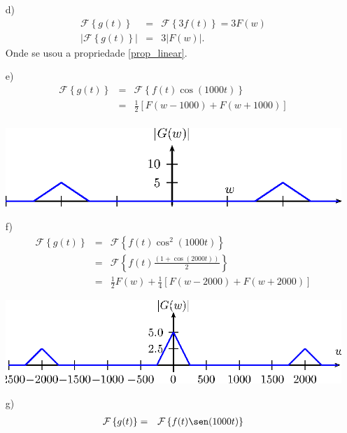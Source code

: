 \begin{resp}
\begin{itemize}
    \item[d)] 
     \begin{eqnarray*}
    \mathcal{F}\left\{g(t)\right\}&=&\mathcal{F}\left\{3f(t)\right\}=3F\left(w\right)\\
    \left|\mathcal{F}\left\{g(t)\right\}\right|&=&3\left|F\left(w\right)\right|.
    \end{eqnarray*}
    Onde se usou a propriedade \ref{prop_linear}.
    \item[e)] 
     \begin{eqnarray*}
    \mathcal{F}\left\{g(t)\right\}&=&\mathcal{F}\left\{f(t)\cos(1000t)\right\}\\
    &=&\frac{1}{2}\left[F(w-1000)+F(w+1000)\right]\\
    \end{eqnarray*}
    \begin{center}
    \includegraphics{cap_propriedades_transformada/pics/figura_16}\end{center}
    \item[f)] 
    \begin{eqnarray*}
    \mathcal{F}\left\{g(t)\right\}&=&\mathcal{F}\left\{f(t)\cos^2(1000t)\right\}\\
    &=&\mathcal{F}\left\{f(t)\frac{\left(1+\cos(2000t)\right)}{2}\right\}\\
    &=&\frac{1}{2}F(w) + \frac{1}{4}\left[F(w-2000)+F(w+2000)\right]
    \end{eqnarray*}
    \begin{center}
    \includegraphics{cap_propriedades_transformada/pics/figura_17}\end{center}
    \item[g)]
    \begin{eqnarray*}
    \mathcal{F}\left\{g(t)\right\}&=&\mathcal{F}\left\{f(t)\sen(1000t)\right\}\\

\end{eqnarray*}
\end{itemize}
\end{resp}
